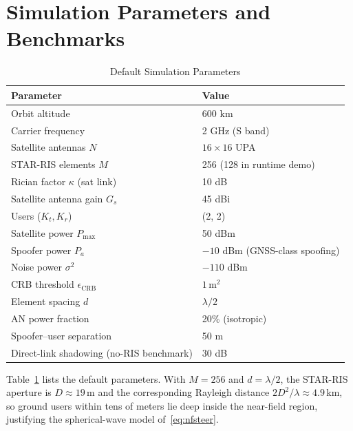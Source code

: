 \section{Simulation Parameters and Benchmarks}\label{sec:sim}

\begin{table}[t]
\centering
\caption{Default Simulation Parameters}
\label{tab:params}
\begin{tabular}{@{}ll@{}}
\toprule
Parameter & Value \\
\midrule
Orbit altitude & 600 km \\
Carrier frequency & 2 GHz (S band) \\
Satellite antennas $N$ & $16 \times 16$ UPA \\
STAR-RIS elements $M$ & 256 (128 in runtime demo) \\
Rician factor $\kappa$ (sat link) & 10 dB \\
Satellite antenna gain $G_s$ & 45 dBi \\
Users ($K_t, K_r$) & (2, 2) \\
Satellite power $P_{\max}$ & 50 dBm \\
Spoofer power $P_a$ & $-10$ dBm (GNSS-class spoofing) \\
Noise power $\sigma^2$ & $-110$ dBm \\
CRB threshold $\epsilon_{\mathrm{CRB}}$ & $1\,\mathrm{m}^2$ \\
Element spacing $d$ & $\lambda/2$ \\
AN power fraction & 20\% (isotropic) \\
Spoofer--user separation & 50 m \\
Direct-link shadowing (no-RIS benchmark) & 30 dB \\
\bottomrule
\end{tabular}
\end{table}

Table~\ref{tab:params} lists the default parameters. With $M=256$ and $d=\lambda/2$, the STAR-RIS aperture is $D \approx 19$\,m and the corresponding Rayleigh distance $2D^2/\lambda \approx 4.9$\,km, so ground users within tens of meters lie deep inside the near-field region, justifying the spherical-wave model of~\eqref{eq:nfsteer}.

